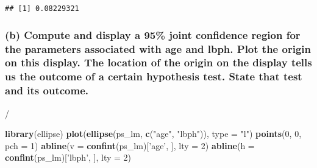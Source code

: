 \documentclass[
]{article}
\newenvironment{Shaded}{\begin{snugshade}}{\end{snugshade}}
\newcommand{\DataTypeTok}[1]{\textcolor[rgb]{0.13,0.29,0.53}{#1}}
\newcommand{\DecValTok}[1]{\textcolor[rgb]{0.00,0.00,0.81}{#1}}
\newcommand{\KeywordTok}[1]{\textcolor[rgb]{0.13,0.29,0.53}{\textbf{#1}}}
\newcommand{\NormalTok}[1]{#1}
\newcommand{\OperatorTok}[1]{\textcolor[rgb]{0.81,0.36,0.00}{\textbf{#1}}}
\newcommand{\StringTok}[1]{\textcolor[rgb]{0.31,0.60,0.02}{#1}}
\begin{document}
\begin{Shaded}
\end{Shaded}

\begin{verbatim}
## [1] 0.08229321
\end{verbatim}

\hypertarget{b-compute-and-display-a-95-joint-confidence-region-for-the-parameters-associated-with-age-and-lbph.-plot-the-origin-on-this-display.-the-location-of-the-origin-on-the-display-tells-us-the-outcome-of-a-certain-hypothesis-test.-state-that-test-and-its-outcome.}{%
\subsubsection{(b) Compute and display a 95\% joint confidence region
for the parameters associated with age and lbph. Plot the origin on this
display. The location of the origin on the display tells us the outcome
of a certain hypothesis test. State that test and its
outcome.}\label{b-compute-and-display-a-95-joint-confidence-region-for-the-parameters-associated-with-age-and-lbph.-plot-the-origin-on-this-display.-the-location-of-the-origin-on-the-display-tells-us-the-outcome-of-a-certain-hypothesis-test.-state-that-test-and-its-outcome.}}

/

\begin{Shaded}
\begin{Highlighting}[]
\KeywordTok{library}\NormalTok{(ellipse) }
\KeywordTok{plot}\NormalTok{(}\KeywordTok{ellipse}\NormalTok{(ps_lm, }\KeywordTok{c}\NormalTok{(}\StringTok{"age"}\NormalTok{, }\StringTok{"lbph"}\NormalTok{)), }\DataTypeTok{type =} \StringTok{"l"}\NormalTok{) }
\KeywordTok{points}\NormalTok{(}\DecValTok{0}\NormalTok{, }\DecValTok{0}\NormalTok{, }\DataTypeTok{pch =} \DecValTok{1}\NormalTok{) }
\KeywordTok{abline}\NormalTok{(}\DataTypeTok{v =} \KeywordTok{confint}\NormalTok{(ps_lm)[}\StringTok{'age'}\NormalTok{, ], }\DataTypeTok{lty =} \DecValTok{2}\NormalTok{) }
\KeywordTok{abline}\NormalTok{(}\DataTypeTok{h =} \KeywordTok{confint}\NormalTok{(ps_lm)[}\StringTok{'lbph'}\NormalTok{, ], }\DataTypeTok{lty =} \DecValTok{2}\NormalTok{) }
\end{Highlighting}
\end{Shaded}
\end{document}
